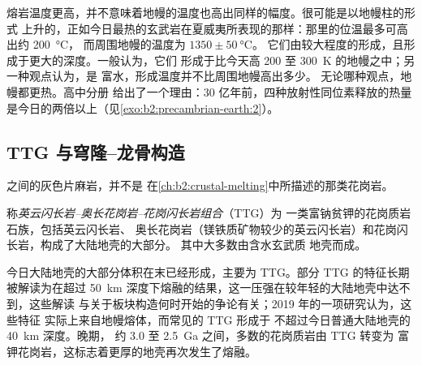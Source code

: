 熔岩温度更高，并不意味着地幔的温度也高出同样的幅度。很可能是以地幔柱的形式
上升的，正如今日最热的玄武岩在夏威夷所表现的那样：那里的位温最多可高出约 \qty{200}{\celsius}，
而周围地幔的温度为 $1350 \pm \qty{50}{\celsius}$。
它们由较大程度的形成，且形成于更大的深度。一般认为，它们
形成于比今天高 200 至 \qty{300}{K} 的地幔之中；另一种观点认为，是
富水，形成温度并不比周围地幔高出多少。
无论哪种观点，地幔都更热。高中分册
给出了一个理由：30 亿年前，四种放射性同位素释放的热量
是今日的两倍以上（见\cref{exo:b2:precambrian-earth:2}）。

\subsection*{TTG 与穹隆–龙骨构造}

之间的灰色片麻岩，并不是
在\cref{ch:b2:crustal-melting}中所描述的那类花岗岩。

\begin{definition}\label{def:b2:precambrian-earth:ttg}
称\emph{英云闪长岩–奥长花岗岩–花岗闪长岩组合}（TTG）为
一类富钠贫钾的花岗质岩石族，包括英云闪长岩、
奥长花岗岩（镁铁质矿物较少的英云闪长岩）和花岗闪长岩，构成了大陆地壳的大部分。
其中大多数由含水玄武质
地壳而成。
\end{definition}

今日大陆地壳的大部分体积在末已经形成，主要为
TTG。部分 TTG 的特征长期被解读为在超过
\qty{50}{km} 深度下熔融的结果，这一压强在较年轻的大陆地壳中达不到，这些解读
与关于板块构造何时开始的争论有关；2019 年的一项研究认为，这些特征
实际上来自地幔熔体，而常见的 TTG 形成于
不超过今日普通大陆地壳的 \qty{40}{km} 深度。晚期，
约 3.0 至 \qty{2.5}{Ga} 之间，多数的花岗质岩由 TTG 转变为
富钾花岗岩，这标志着更厚的地壳再次发生了熔融。

